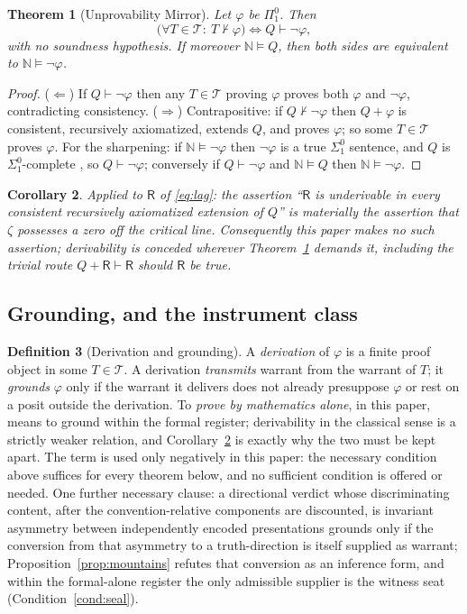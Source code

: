 \documentclass[twocolumn,10pt]{article}
\theoremstyle{plain}
\newtheorem{theorem}{Theorem}[section]
\newtheorem{corollary}[theorem]{Corollary}
\theoremstyle{definition}
\newtheorem{definition}[theorem]{Definition}
\newcommand{\R}{\mathsf{R}}
\newcommand{\N}{\mathbb{N}}
\begin{document}
\begin{theorem}[Unprovability Mirror]\label{thm:mirror}
Let $\varphi$ be $\Pi^0_1$. Then
\[
\bigl(\forall T\in\mathcal T:\ T\nvdash\varphi\bigr)\iff Q\vdash\neg\varphi ,
\]
with no soundness hypothesis. If moreover $\N\models Q$, then both sides are equivalent to $\N\models\neg\varphi$.
\end{theorem}
\begin{proof}
($\Leftarrow$) If $Q\vdash\neg\varphi$ then any $T\in\mathcal T$ proving $\varphi$ proves both $\varphi$ and $\neg\varphi$, contradicting consistency. ($\Rightarrow$) Contrapositive: if $Q\nvdash\neg\varphi$ then $Q+\varphi$ is consistent, recursively axiomatized, extends $Q$, and proves $\varphi$; so some $T\in\mathcal T$ proves $\varphi$. For the sharpening: if $\N\models\neg\varphi$ then $\neg\varphi$ is a true $\Sigma^0_1$ sentence, and $Q$ is $\Sigma^0_1$-complete \cite{Kaye1991,HajekPudlak}, so $Q\vdash\neg\varphi$; conversely if $Q\vdash\neg\varphi$ and $\N\models Q$ then $\N\models\neg\varphi$.
\end{proof}

\begin{corollary}\label{cor:mirror}
Applied to $\R$ of \eqref{eq:lag}: the assertion ``$\R$ is underivable in every consistent recursively axiomatized extension of $Q$'' is materially the assertion that $\zeta$ possesses a zero off the critical line. Consequently this paper makes no such assertion; derivability is conceded wherever Theorem~\ref{thm:mirror} demands it, including the trivial route $Q+\R\vdash\R$ should $\R$ be true.
\end{corollary}

\subsection{Grounding, and the instrument class}
\begin{definition}[Derivation and grounding]\label{def:ground}
A \emph{derivation} of $\varphi$ is a finite proof object in some $T\in\mathcal T$. A derivation \emph{transmits} warrant from the warrant of $T$; it \emph{grounds} $\varphi$ only if the warrant it delivers does not already presuppose $\varphi$ or rest on a posit outside the derivation. To \emph{prove by mathematics alone}, in this paper, means to ground within the formal register; derivability in the classical sense is a strictly weaker relation, and Corollary~\ref{cor:mirror} is exactly why the two must be kept apart. The term is used only negatively in this paper: the necessary condition above suffices for every theorem below, and no sufficient condition is offered or needed. One further necessary clause: a directional verdict whose discriminating content, after the convention-relative components are discounted, is invariant asymmetry between independently encoded presentations grounds only if the conversion from that asymmetry to a truth-direction is itself supplied as warrant; Proposition~\ref{prop:mountains} refutes that conversion as an inference form, and within the formal-alone register the only admissible supplier is the witness seat (Condition~\ref{cond:seal}).
\end{definition}
\end{document}
